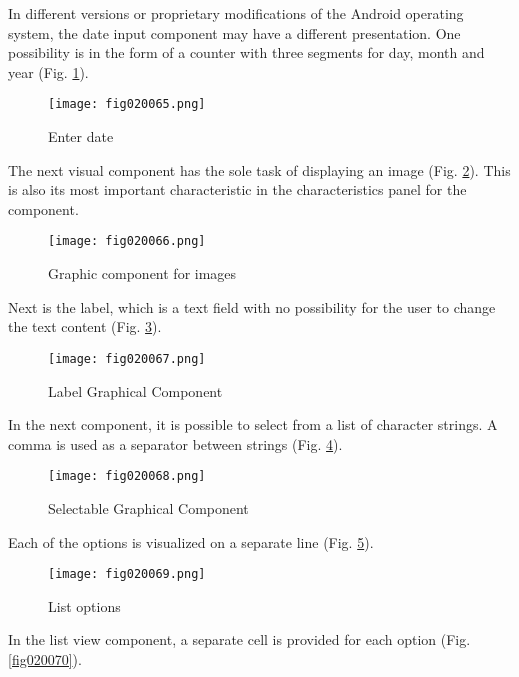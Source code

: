 In different versions or proprietary modifications of the Android operating system, the date input component may have a different presentation. One possibility is in the form of a counter with three segments for day, month and year (Fig. \ref{fig020065}).

\begin{figure}[H]
   \centering
   \texttt{[image: fig020065.png]}
   \caption{Enter date}
\label{fig020065}
\end{figure}

The next visual component has the sole task of displaying an image (Fig. \ref{fig020066}). This is also its most important characteristic in the characteristics panel for the component.

\begin{figure}[H]
   \centering
   \texttt{[image: fig020066.png]}
   \caption{Graphic component for images}
\label{fig020066}
\end{figure}

Next is the label, which is a text field with no possibility for the user to change the text content (Fig. \ref{fig020067}).

\begin{figure}[H]
   \centering
   \texttt{[image: fig020067.png]}
   \caption{Label Graphical Component}
\label{fig020067}
\end{figure}

In the next component, it is possible to select from a list of character strings. A comma is used as a separator between strings (Fig. \ref{fig020068}).

\begin{figure}[H]
   \centering
   \texttt{[image: fig020068.png]}
   \caption{Selectable Graphical Component}
\label{fig020068}
\end{figure}

Each of the options is visualized on a separate line (Fig. \ref{fig020069}).

\begin{figure}[H]
   \centering
   \texttt{[image: fig020069.png]}
   \caption{List options}
\label{fig020069}
\end{figure}

In the list view component, a separate cell is provided for each option (Fig. \ref{fig020070}).

